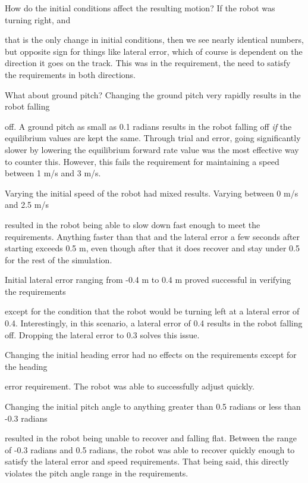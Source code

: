 \documentclass[10pt, letterbox]{article}
\begin{document}
\begin{addmargin}[5em]{0em}
How do the initial conditions affect the resulting motion? If the robot was turning right, and\end{addmargin} that is the only change in initial conditions, then we see nearly identical numbers, but opposite sign for things like lateral error, which of course is dependent on the direction it goes on the track. This was in the requirement, the need to satisfy the requirements in both directions. 
\begin{addmargin}[5em]{0em}
What about ground pitch? Changing the ground pitch very rapidly results in the robot falling \end{addmargin} off. A ground pitch as small as 0.1 radians results in the robot falling off \textit{if} the equilibrium values are kept the same. Through trial and error, going significantly slower by lowering the equilibrium forward rate value was the most effective way to counter this. However, this fails the requirement for maintaining a speed between 1 m/s and 3 m/s. 
\begin{addmargin}[5em]{0em}
Varying the initial speed of the robot had mixed results. Varying between 0 m/s and 2.5 m/s \end{addmargin} resulted in the robot being able to slow down fast enough to meet the requirements. Anything faster than that and the lateral error a few seconds after starting exceeds 0.5 m, even though after that it does recover and stay under 0.5 for the rest of the simulation. 
\begin{addmargin}[5em]{0em}
Initial lateral error ranging from -0.4 m to 0.4 m proved successful in verifying the requirements \end{addmargin} except for the condition that the robot would be turning left at a lateral error of 0.4. Interestingly, in this scenario, a lateral error of 0.4 results in the robot falling off. Dropping the lateral error to 0.3 solves this issue. 
\begin{addmargin}[5em]{0em}
Changing the initial heading error had no effects on the requirements except for the heading \end{addmargin} error requirement. The robot was able to successfully adjust quickly.
\\ 
\begin{addmargin}[5em]{0em}
Changing the initial pitch angle to anything greater than 0.5 radians or less than -0.3 radians \end{addmargin}resulted in the robot being unable to recover and falling flat. Between the range of -0.3 radians and 0.5 radians, the robot was able to recover quickly enough to satisfy the lateral error and speed requirements. That being said, this directly violates the pitch angle range in the requirements.
\end{document}
